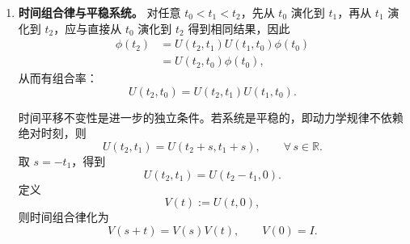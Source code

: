 \documentclass[UTF8,a4paper,11pt,openany]{ctexbook}
\begin{document}
\begin{enumerate}
    由于 $U(t,t_0)$ 线性且保持范数，
    \begin{align}
        \langle U\phi,U\psi\rangle
        &=
        \frac14
        \Bigl(
            \|U\phi+U\psi\|^2-\|U\phi-U\psi\|^2
            \nonumber\\
        &\qquad
            -i\|U\phi+iU\psi\|^2
            +i\|U\phi-iU\psi\|^2
        \Bigr)
        \nonumber\\
        &=
        \frac14
        \Bigl(
            \|U(\phi+\psi)\|^2-\|U(\phi-\psi)\|^2
            \nonumber\\
        &\qquad
            -i\|U(\phi+i\psi)\|^2
            +i\|U(\phi-i\psi)\|^2
        \Bigr)
        \nonumber\\
        &=
        \frac14
        \Bigl(
            \|\phi+\psi\|^2-\|\phi-\psi\|^2
            -i\|\phi+i\psi\|^2+i\|\phi-i\psi\|^2
        \Bigr)
        \nonumber\\
        &=
        \langle\phi,\psi\rangle.
    \end{align}
    因此
    \begin{equation}
        U(t,t_0)^\dagger U(t,t_0)=I.
    \end{equation}

    这一步只说明时间演化保持 Hilbert 空间的内积和距离。严格地说，它本身还没有说明
    $U(t,t_0)$ 的逆就是物理上的反向时间演化 $U(t_0,t)$；时间上的可逆性要结合下面的群结构才能得到。

    \item \textbf{时间组合律与平稳系统。} 对任意 $t_0<t_1<t_2$，先从 $t_0$ 演化到 $t_1$，再从 $t_1$ 演化到 $t_2$，应与直接从 $t_0$ 演化到 $t_2$ 得到相同结果，因此
    \begin{align}
        \phi(t_2)
        &=
        U(t_2,t_1)U(t_1,t_0)\phi(t_0)
        \nonumber\\
        &=
        U(t_2,t_0)\phi(t_0),
    \end{align}
    从而有组合率：
    \begin{equation}
        U(t_2,t_0)
        =
        U(t_2,t_1)U(t_1,t_0).
    \end{equation}

    时间平移不变性是进一步的独立条件。若系统是平稳的，即动力学规律不依赖绝对时刻，则
    \begin{equation}
        U(t_2,t_1)
        =
        U(t_2+s,t_1+s),
        \qquad
        \forall\,s\in\mathbb R.
    \end{equation}
    取 $s=-t_1$，得到
    \begin{equation}
        U(t_2,t_1)
        =
        U(t_2-t_1,0).
    \end{equation}
    定义
    \begin{equation}
        V(t):=U(t,0),
    \end{equation}
    则时间组合律化为
    \begin{equation}
        V(s+t)=V(s)V(t),
        \qquad
        V(0)=I.
    \end{equation}


\end{enumerate}
\end{document}
